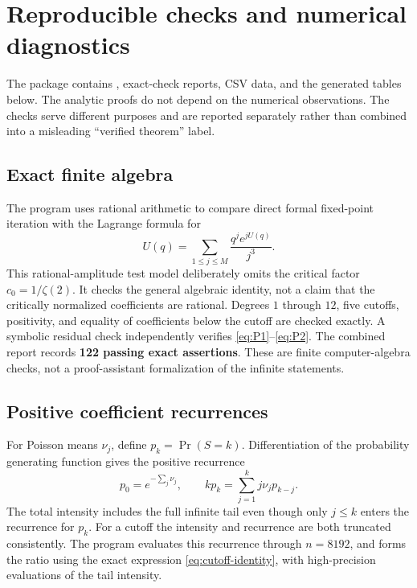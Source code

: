 \documentclass[11pt,a4paper]{article}
\numberwithin{equation}{section}
\theoremstyle{definition}
\theoremstyle{remark}
\newcommand{\eps}{\varepsilon}
\begin{document}
\section{Reproducible checks and numerical diagnostics}
\label{sec:checks}
The package contains , exact-check reports, CSV data, and
the generated tables below. The analytic proofs do not depend on the
numerical observations. The checks serve different purposes and are reported
separately rather than combined into a misleading ``verified theorem'' label.

\subsection{Exact finite algebra}
The program uses rational arithmetic to compare direct formal fixed-point
iteration with the Lagrange formula for
\[
 U(q)=\sum_{1\le j\le M}\frac{q^j e^{jU(q)}}{j^3}.
\]
This rational-amplitude test model deliberately omits the critical factor
\(c_0=1/\zeta(2)\). It checks the general algebraic identity, not a claim that
the critically normalized coefficients are rational. Degrees \(1\) through
\(12\), five cutoffs, positivity, and equality of coefficients below the
cutoff are checked exactly. A symbolic residual check independently verifies
\eqref{eq:P1}--\eqref{eq:P2}. The combined report records \textbf{122 passing
exact assertions}. These are finite computer-algebra checks, not a
proof-assistant formalization of the infinite statements.

\subsection{Positive coefficient recurrences}
For Poisson means \(\nu_j\), define \(p_k=\Pr(S=k)\). Differentiation of the
probability generating function gives the positive recurrence
\begin{equation}
 p_0=e^{-\sum_j\nu_j},\qquad
 kp_k=\sum_{j=1}^k j\nu_jp_{k-j}.
 \label{eq:panjer}
\end{equation}
The total intensity includes the full infinite tail even though only
\(j\le k\) enters the recurrence for \(p_k\). For a cutoff the intensity
and recurrence are both truncated consistently. The program evaluates this
recurrence through \(n=8192\), and forms the ratio using the exact expression
\eqref{eq:cutoff-identity}, with high-precision evaluations of the tail
intensity.

\begin{table}[htbp]
\centering\small

\caption{Coefficient diagnostics for \(\eps=\lambda/\log n\). Cutoff
arguments are rounded down to integers. The limiting values in the last
three columns are \(1\), \(e^{-1/2}\approx0.60653\), and
\(e^{-2/9}\approx0.80074\), respectively.}
\label{tab:coefficients}
\end{table}
\end{document}
